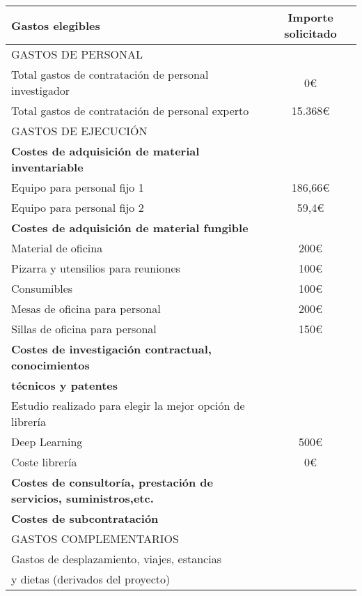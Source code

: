 \begin{table}[H]
		\begin{tabular}{|l|c|} \toprule
		\cellcolor{red} Gastos elegibles & Importe solicitado \\
		\hline \hline
		\cellcolor[gray]{0.5}GASTOS DE PERSONAL &  \\ \hline
		Total gastos de contratación de personal investigador & 0\euro \\ \hline
		Total gastos de contratación de personal experto & 15.368\euro \\ \hline
		\cellcolor[gray]{0.5}GASTOS DE EJECUCIÓN &  \\ \hline
		\cellcolor[gray]{0.8}\textbf{Costes de adquisición de material inventariable} &  \\ \hline
		Equipo para personal fijo 1 & 186,66\euro  \\ \hline
		Equipo para personal fijo 2 & 59,4\euro \\ \hline
		\cellcolor[gray]{0.8}\textbf{Costes de adquisición de material fungible} &  \\ \hline
		Material de oficina & 200\euro \\ \hline
		Pizarra y utensilios para reuniones & 100\euro \\ \hline
		Consumibles & 100\euro \\ \hline
		Mesas de oficina para personal &  200\euro \\ \hline
		Sillas de oficina para personal &  150\euro \\ \hline
		\cellcolor[gray]{0.8}\textbf{Costes de investigación contractual, conocimientos } \\
		\cellcolor[gray]{0.8}\textbf{técnicos y patentes} & \\ \hline
		Estudio realizado para elegir la mejor opción de librería\\
		Deep Learning & 500\euro   \\ \hline
		Coste librería & 0\euro \\ \hline
		\cellcolor[gray]{0.8}\textbf{Costes de consultoría, prestación de servicios, suministros,etc.} &  \\ \hline
		\cellcolor[gray]{0.8}\textbf{Costes de subcontratación} &  \\ \hline
		\cellcolor[gray]{0.5}GASTOS COMPLEMENTARIOS &  \\ \hline
		\cellcolor[gray]{0.8}Gastos de desplazamiento, viajes, estancias    \\ 
		\cellcolor[gray]{0.8}y dietas (derivados del proyecto) &  \\ \hline

\end{tabular}
\end{table}
